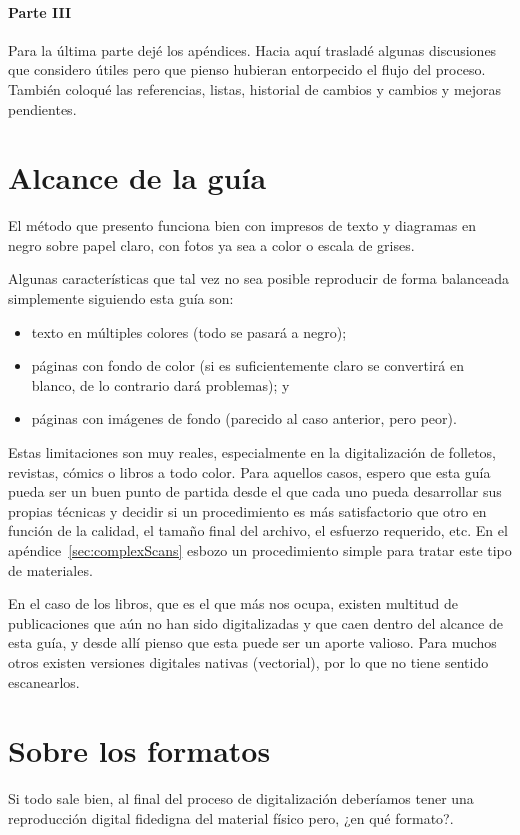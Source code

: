 \documentclass[%
	a5paper,
	10pt,
	twoside,
	openright,
	final,
]{memoir}
\begin{document}
{	\paragraph{Parte III} Para la última parte dejé los apéndices. Hacia aquí trasladé algunas discusiones que considero útiles pero que pienso hubieran entorpecido el flujo del proceso. También coloqué las referencias, listas, historial de cambios y cambios y mejoras pendientes.

	\section{Alcance de la guía\label{sec:scope}} El método que presento funciona bien con impresos de texto y diagramas en negro sobre papel claro, con fotos ya sea a color o escala de grises.

	Algunas características que tal vez no sea posible reproducir de forma balanceada simplemente siguiendo esta guía son:

	\begin{itemize}[noitemsep]
		\item texto en múltiples colores (todo se pasará a negro);
		\item páginas con fondo de color (si es suficientemente claro se convertirá en blanco, de lo contrario dará problemas); y
		\item páginas con imágenes de fondo (parecido al caso anterior, pero peor).
	\end{itemize}

	Estas limitaciones son muy reales, especialmente en la digitalización de folletos, revistas, cómics o libros a todo color. Para aquellos casos, espero que esta guía pueda ser un buen punto de partida desde el que cada uno pueda desarrollar sus propias técnicas y decidir si un procedimiento es más satisfactorio que otro en función de la calidad, el tamaño final del archivo, el esfuerzo requerido, etc. En el apéndice~\ref{sec:complexScans} esbozo un procedimiento simple para tratar este tipo de materiales.

	En el caso de los libros, que es el que más nos ocupa, existen multitud de publicaciones que aún no han sido digitalizadas y que caen dentro del alcance de esta guía, y desde allí pienso que esta puede ser un aporte valioso. Para muchos otros existen versiones digitales nativas (\pdf vectorial), por lo que no tiene sentido escanearlos.

	\section{Sobre los formatos} Si todo sale bien, al final del proceso de digitalización deberíamos tener una reproducción digital fidedigna del material físico pero, ¿en qué formato?.

}
\end{document}
